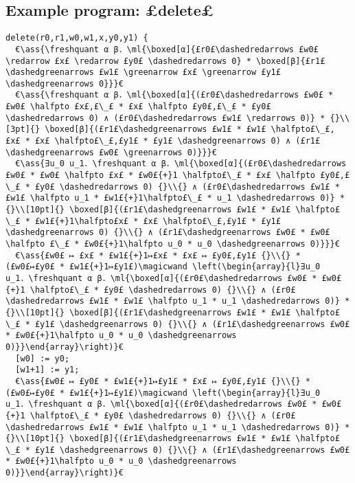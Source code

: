 \documentclass[10pt,a4paper]{article}
\makeatletter
\renewcommand{\boxed}[2][]{%
  \renewcommand{\arraystretch}{0.9}%
  \mbox{\mdseries\begin{tabular}{|@{\hspace{2px}}L@{\hspace{2px}}|}\hline #2 \\ \hline \end{tabular}}_{\ifthenelse{\equal{#1}{a}}{\rm a}{\ifthenelse{\equal{#1}{b}}{\rm b}{#1}}}%
}
\newcommand{\freshquant}{\reflectbox{$\mathsf{N}$}}
\newcommand{\ml}[2][t]{\mbox{\mdseries\begin{tabular}[#1]{@{}L@{}}#2\end{tabular}}}
\newcommand{\ass}[1]{\ensuremath{{\color{blue}\left\{\ml[c]{#1}\right\}}}}
\makeatother
\begin{document}
\newpage
\subsection{Example program: £delete£}

\begin{lstlisting}
delete(r0,r1,w0,w1,x,y0,y1) {
  €\ass{\freshquant α β．\ml{\boxed[α]{£r0£\dashedredarrows £w0£ \redarrow £x£ \redarrow £y0£ \dashedredarrows 0} * \boxed[β]{£r1£\dashedgreenarrows £w1£ \greenarrow £x£ \greenarrow £y1£ \dashedgreenarrows 0}}}€
  €\ass{\freshquant α β．\ml{\boxed[α]{(£r0£\dashedredarrows £w0£ * £w0£ \halfpto £x£,£\_£ * £x£ \halfpto £y0£,£\_£ * £y0£ \dashedredarrows 0) ∧ (£r0£\dashedredarrows £w1£ \redarrows 0)} * {}\\[3pt]{} \boxed[β]{(£r1£\dashedgreenarrows £w1£ * £w1£ \halfpto£\_£, £x£ * £x£ \halfpto£\_£,£y1£ * £y1£ \dashedgreenarrows 0) ∧ (£r1£\dashedgreenarrows £w0£ \greenarrows 0)}}}€
  €\ass{∃u_0 u_1．\freshquant α β．\ml{\boxed[α]{(£r0£\dashedredarrows £w0£ * £w0£ \halfpto £x£ * £w0£{+}1 \halfpto£\_£ * £x£ \halfpto £y0£,£\_£ * £y0£ \dashedredarrows 0) {}\\{} ∧ (£r0£\dashedredarrows £w1£ * £w1£ \halfpto u_1 * £w1£{+}1\halfpto£\_£ * u_1 \dashedredarrows 0)} * {}\\[10pt]{} \boxed[β]{(£r1£\dashedgreenarrows £w1£ * £w1£ \halfpto£\_£ * £w1£{+}1\halfpto£x£ * £x£ \halfpto£\_£,£y1£ * £y1£ \dashedgreenarrows 0) {}\\{} ∧ (£r1£\dashedgreenarrows £w0£ * £w0£ \halfpto £\_£ * £w0£{+}1\halfpto u_0 * u_0 \dashedgreenarrows 0)}}}€
  €\ass{£w0£ ↦ £x£ * £w1£{+}1↦£x£ * £x£ ↦ £y0£,£y1£ {}\\{} * (£w0£↦£y0£ * £w1£{+}1↦£y1£)\magicwand \left(\begin{array}{l}∃u_0 u_1．\freshquant α β．\ml{\boxed[α]{(£r0£\dashedredarrows £w0£ * £w0£{+}1 \halfpto£\_£ * £y0£ \dashedredarrows 0) {}\\{} ∧ (£r0£\dashedredarrows £w1£ * £w1£ \halfpto u_1 * u_1 \dashedredarrows 0)} * {}\\[10pt]{} \boxed[β]{(£r1£\dashedgreenarrows £w1£ * £w1£ \halfpto£\_£ * £y1£ \dashedgreenarrows 0) {}\\{} ∧ (£r1£\dashedgreenarrows £w0£ * £w0£{+}1\halfpto u_0 * u_0 \dashedgreenarrows 0)}}\end{array}\right)}€
  [w0] := y0;
  [w1+1] := y1;
  €\ass{£w0£ ↦ £y0£ * £w1£{+}1↦£y1£ * £x£ ↦ £y0£,£y1£ {}\\{} * (£w0£↦£y0£ * £w1£{+}1↦£y1£)\magicwand \left(\begin{array}{l}∃u_0 u_1．\freshquant α β．\ml{\boxed[α]{(£r0£\dashedredarrows £w0£ * £w0£{+}1 \halfpto£\_£ * £y0£ \dashedredarrows 0) {}\\{} ∧ (£r0£\dashedredarrows £w1£ * £w1£ \halfpto u_1 * u_1 \dashedredarrows 0)} * {}\\[10pt]{} \boxed[β]{(£r1£\dashedgreenarrows £w1£ * £w1£ \halfpto£\_£ * £y1£ \dashedgreenarrows 0) {}\\{} ∧ (£r1£\dashedgreenarrows £w0£ * £w0£{+}1\halfpto u_0 * u_0 \dashedgreenarrows 0)}}\end{array}\right)}€

\end{lstlisting}
\end{document}
